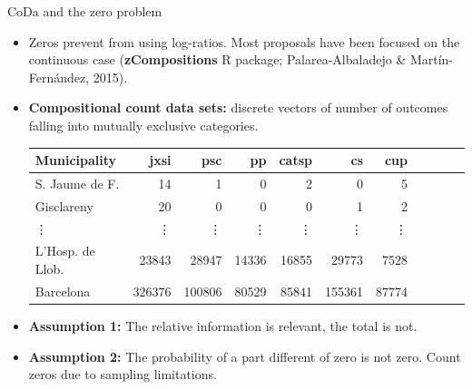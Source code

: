 \documentclass[9pt]{beamer}
\begin{document}
\begin{frame}{CoDa and the zero problem}

\begin{itemize}
\item Zeros prevent from using log-ratios. Most proposals have been focused on the continuous case (\textbf{zCompositions} R package; Palarea-Albaladejo \& Martín-Fernández, 2015).
\item
  \textbf{Compositional count data sets:} discrete vectors of number of outcomes falling into mutually exclusive categories.
\begin{table}[ht]
\centering
\scriptsize
\begin{tabular}{lrrrrrrrrrr}
  \hline
\textbf{Municipality} & \textbf{jxsi} & \textbf{psc} & \textbf{pp} & \textbf{catsp} & \textbf{cs} & \textbf{cup}  \\ 
  \hline
   S. Jaume de F. &  14 &   1 &   {\color{red}0} &   2 &   {\color{red}0} &   5  \\ 
  Gisclareny &  20 &   {\color{red}0} &   {\color{red}0} &   {\color{red}0} &   1 &   2  \\ 
\vdots &  \vdots &  \vdots & \vdots & \vdots  &  \vdots & \vdots  \\
L'Hosp. de Llob. & 23843 & 28947 & 14336 & 16855 & 29773 & 7528\\
Barcelona & 326376 & 100806 & 80529 & 85841 & 155361 & 87774 \\
\end{tabular}
\end{table}
\item \textbf{Assumption 1:} The relative information is relevant, the total is not.  
\item \textbf{Assumption 2:} The probability of a part different of zero is not zero. Count zeros due to sampling limitations.

\end{itemize}

\end{frame}
\end{document}
